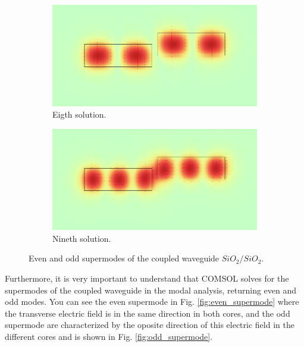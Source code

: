 \documentclass[a4paper,12pt]{article}
\begin{document}
\begin{figure}[H]
    \centering
    \begin{subfigure}{0.45\textwidth}
        \centering
        \includegraphics[scale=0.32]{SiO2_SiO2d_0.5um_dy1um_normE_7.png}
        \caption{Eigth solution.}
    \end{subfigure}
    \hfill
    \begin{subfigure}{0.45\textwidth}
        \centering
        \includegraphics[scale=0.32]{SiO2_SiO2d_0.5um_dy1um_normE_8.png}
        \caption{Nineth solution.}
    \end{subfigure}
    \caption{Even and odd supermodes of the coupled waveguide $SiO_2/SiO_2$.}
    \label{fig:shifted_core2}
\end{figure}


Furthermore, it is very important to understand that COMSOL solves for the supermodes of the coupled waveguide in the modal analysis, returning even and odd modes. You can see the even supermode in Fig. \ref{fig:even_supermode} where the transverse electric field is in the same direction in both cores, and the odd supermode are characterized by the oposite direction of this electric field in the different cores and is shown in Fig. \ref{fig:odd_supermode}.
\end{document}
